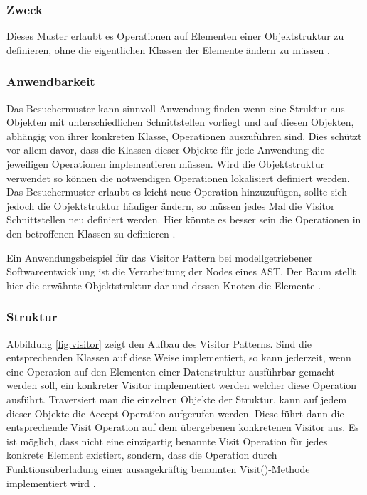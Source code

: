 \documentclass[12pt,oneside,a4paper,parskip]{scrbook}
\begin{document}
\subsubsection{Zweck}

Dieses Muster erlaubt es Operationen auf Elementen einer Objektstruktur zu definieren, ohne die eigentlichen Klassen der Elemente ändern zu müssen \cite[S. 480]{gamma2015}.

\subsubsection{Anwendbarkeit}

Das Besuchermuster kann sinnvoll Anwendung finden wenn eine Struktur aus Objekten mit unterschiedlichen Schnittstellen vorliegt und auf diesen Objekten, abhängig von ihrer konkreten Klasse, Operationen auszuführen sind. Dies schützt vor allem davor, dass die Klassen dieser Objekte für jede Anwendung die jeweiligen Operationen implementieren müssen. Wird die Objektstruktur verwendet so können die notwendigen Operationen lokalisiert definiert werden. Das Besuchermuster erlaubt es leicht neue Operation hinzuzufügen, sollte sich jedoch die Objektstruktur häufiger ändern, so müssen jedes Mal die Visitor Schnittstellen neu definiert werden. Hier könnte es besser sein die Operationen in den betroffenen Klassen zu definieren \cite[S. 484]{gamma2015}.

Ein Anwendungsbeispiel für das Visitor Pattern bei modellgetriebener Softwareentwicklung ist die Verarbeitung der Nodes eines AST. Der Baum stellt hier die erwähnte Objektstruktur dar und dessen Knoten die Elemente \cite[S. 480]{gamma2015}.

\subsubsection{Struktur}

Abbildung \ref{fig:visitor} zeigt den Aufbau des Visitor Patterns. Sind die entsprechenden Klassen auf diese Weise implementiert, so kann jederzeit, wenn eine Operation auf den Elementen einer Datenstruktur ausführbar gemacht werden soll, ein konkreter Visitor implementiert werden welcher diese Operation ausführt. Traversiert man die einzelnen Objekte der Struktur, kann auf jedem dieser Objekte die Accept Operation aufgerufen werden. Diese führt dann die entsprechende Visit Operation auf dem übergebenen konkretenen Visitor aus. Es ist möglich, dass nicht eine einzigartig benannte Visit Operation für jedes konkrete Element existiert, sondern, dass die Operation durch Funktionsüberladung einer aussagekräftig benannten Visit()-Methode implementiert wird \cite[S.485 ff.]{gamma2015}.
\end{document}
